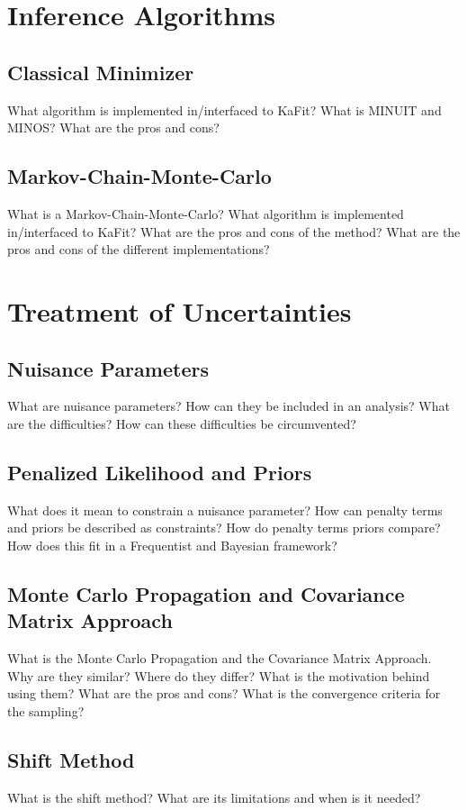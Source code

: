 \documentclass{document/thesisclass}
\begin{document}
    \section{Inference Algorithms}
    \subsection{Classical Minimizer}
    What algorithm is implemented in/interfaced to KaFit? What is MINUIT and MINOS? What are the pros and cons?
    \subsection{Markov-Chain-Monte-Carlo}
    What is a Markov-Chain-Monte-Carlo?  What algorithm is implemented in/interfaced to KaFit? What are the pros and cons of the method? What are the pros and cons of the different implementations?
    
    \section{Treatment of Uncertainties}
    \subsection{Nuisance Parameters}
    What are nuisance parameters? How can they be included in an analysis? What are the difficulties? How can these difficulties be circumvented?
    \subsection{Penalized Likelihood and Priors}
    What does it mean to constrain a nuisance parameter? How can penalty terms and priors be described as constraints? How do penalty terms priors compare? How does this fit in a Frequentist and Bayesian framework?
    \subsection{Monte Carlo Propagation and Covariance Matrix Approach}
    What is the Monte Carlo Propagation and the Covariance Matrix Approach. Why are they similar? Where do they differ? What is the motivation behind using them? What are the pros and cons? What is the convergence criteria for the sampling?
    \subsection{Shift Method}
    What is the shift method? What are its limitations and when is it needed?
    
\end{document}

